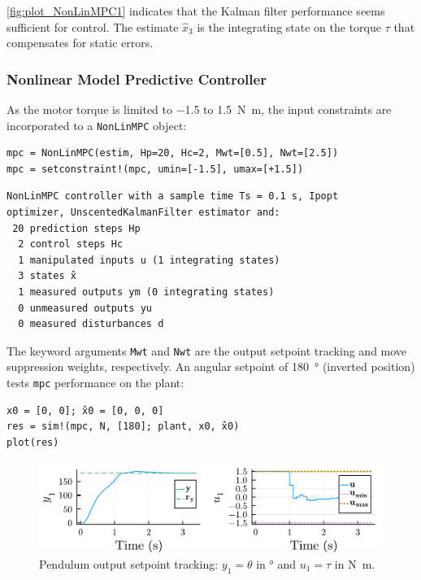 \cref{fig:plot_NonLinMPC1} indicates that the Kalman filter performance seems sufficient for control. The estimate $\hat{x}_3$ is the integrating state on the torque $\tau$ that compensates for static errors. 

\subsubsection{Nonlinear Model Predictive Controller}

As the motor torque is limited to \num{-1.5} to \SI{1.5}{\newton\meter}, the input constraints are incorporated to a \texttt{NonLinMPC} object:
\begin{verbatim}
mpc = NonLinMPC(estim, Hp=20, Hc=2, Mwt=[0.5], Nwt=[2.5])
mpc = setconstraint!(mpc, umin=[-1.5], umax=[+1.5])
\end{verbatim}
\spacerepl
\begin{verbatim}
NonLinMPC controller with a sample time Ts = 0.1 s, Ipopt
optimizer, UnscentedKalmanFilter estimator and:
 20 prediction steps Hp
  2 control steps Hc
  1 manipulated inputs u (1 integrating states)
  3 states x̂
  1 measured outputs ym (0 integrating states)
  0 unmeasured outputs yu
  0 measured disturbances d
\end{verbatim}

The keyword arguments \texttt{Mwt} and \texttt{Nwt} are the output setpoint tracking and move suppression weights, respectively. An angular setpoint of \SI{180}{\degree} (inverted position) tests \texttt{mpc} performance on the plant: 

\begin{verbatim}
x0 = [0, 0]; x̂0 = [0, 0, 0]
res = sim!(mpc, N, [180]; plant, x0, x̂0)
plot(res)
\end{verbatim}

\begin{figure}[h]
    \centering
    \includegraphics[width=\columnwidth]{fig/plot_NonLinMPC2.pdf}
    \caption{Pendulum output setpoint tracking: $y_1 = \theta$ in \si{\degree} and $u_1 = \tau$ in \si{\newton\meter}.}
    \label{fig:plot_NonLinMPC2}
\end{figure}

